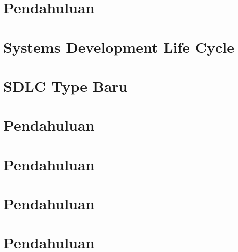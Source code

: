 \documentclass[12pt]{article}
\begin{document}
    

    
    \tableofcontents
    
    \newpage
    
    \section{Pendahuluan}
    
    
    \newpage
    
    \begin{multicols}{2}
        \section{Systems Development Life Cycle}
        
    
        \section{SDLC Type Baru}
        
        
        \section{Pendahuluan}
        
    
        \section{Pendahuluan}
        
        
        \section{Pendahuluan}
        
        
        \section{Pendahuluan}
        
    \end{multicols}
    
\end{document}
